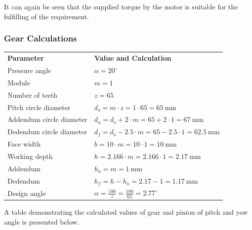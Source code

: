 \documentclass[12pt]{article}
\renewcommand{\arraystretch}{1.2} %
\begin{document}
It can again be seen that the supplied torque by the motor is suitable for the fulfilling of the requirement.

\subsubsection{Gear Calculations}

\begin{table}[ht]
\centering
\renewcommand{\arraystretch}{1.5}
\setlength{\tabcolsep}{10pt}
\begin{tabular}{>{\raggedright\arraybackslash}p{5cm} >{\raggedright\arraybackslash}p{8cm}}
\textbf{Parameter}          & \textbf{Value and Calculation} \\ 
Pressure angle              & $\alpha = 20^\circ$ \\ 
Module                     & $m = 1$ \\ 
Number of teeth             & $z = 65$ \\ 
Pitch circle diameter       & $d_o = m \cdot z = 1 \cdot 65 = 65\ \text{mm}$ \\ 
Addendum circle diameter    & $d_a = d_o + 2 \cdot m = 65 + 2 \cdot 1 = 67\ \text{mm}$ \\ 
Dedendum circle diameter    & $d_f = d_o - 2.5 \cdot m = 65 - 2.5 \cdot 1 = 62.5\ \text{mm}$ \\ 
Face width                  & $b = 10 \cdot m = 10 \cdot 1 = 10\ \text{mm}$ \\ 
Working depth               & $h = 2.166 \cdot m = 2.166 \cdot 1 = 2.17\ \text{mm}$ \\ 
Addendum                    & $h_a = m = 1\ \text{mm}$ \\ 
Dedendum                    & $h_f = h - h_a = 2.17 - 1 = 1.17\ \text{mm}$ \\ 
Design angle                & $\alpha = \frac{180}{z} = \frac{180}{65} = 2.77^\circ$ \\ 
\end{tabular}
\label{tab:gear_parameters}
\end{table}
\newpage

A table demonstrating the calculated values of gear and pinion of pitch and yaw angle is presented below.
\end{document}
